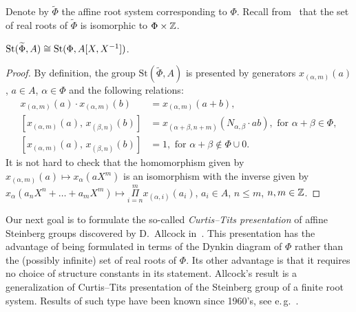 Denote by $\widetilde{\Phi}$ the affine root system corresponding to $\Phi$.
Recall from~\cite[\S~4]{A16} that the set of real roots of $\widetilde{\Phi}$ is isomorphic to $\Phi \times \mathbb{Z}$.
\begin{lemma} \label{lem:affine-vs-loop} $\operatorname{St}(\widetilde{\Phi}, A) \cong \operatorname{St}(\Phi, A[X, X^{-1}])$.
\end{lemma}
\begin{proof}
    By definition, the group $\mathrm{St}(\widetilde{\Phi}, A)$ is presented by generators $x_{(\alpha, m)}(a)$, $a \in A$, $\alpha \in \Phi$ and
    the following relations:
    \begin{align}
        x_{(\alpha, m)}(a)\cdot x_{(\alpha, m)}(b)&=x_{(\alpha, m)}(a+b),  \label{AR1}\\
        [x_{(\alpha, m)}(a),\,x_{(\beta, n)}(b)]  &=x_{(\alpha+\beta, n+m)}(N_{\alpha,\beta} \cdot ab),\text{ for }\alpha+\beta\in\Phi, \label{AR2} \\
        [x_{(\alpha, m)}(a),\,x_{(\beta, n)}(b)]  &=1,\text{ for }\alpha+\beta\not\in\Phi\cup0. \label{AR3}
    \end{align}
    It is not hard to check that the homomorphism given by $x_{(\alpha, m)}(a) \mapsto x_\alpha(aX^m)$ is an isomorphism with the inverse given by
    $x_\alpha(a_{n}X^n + \ldots + a_m X^m) \mapsto \Pi\limits_{i=n}^m x_{(\alpha, i)}(a_i)$, $a_i \in A$, $n \leq m$, $n, m\in \mathbb{Z}$.
\end{proof}

Our next goal is to formulate the so-called \textit{Curtis--Tits presentation} of affine Steinberg groups discovered by D.~Allcock in~\cite{A16, A13}.
This presentation has the advantage of being formulated in terms of the Dynkin diagram of $\Phi$ rather than the (possibly infinite) set of real roots of $\Phi$.
Its other advantage is that it requires no choice of structure constants in its statement.
Allcock's result is a generalization of Curtis--Tits presentation of the Steinberg group of a finite root system.
Results of such type have been known since 1960's, see e.\,g.~\cite[Theorem~B]{DS74}.

